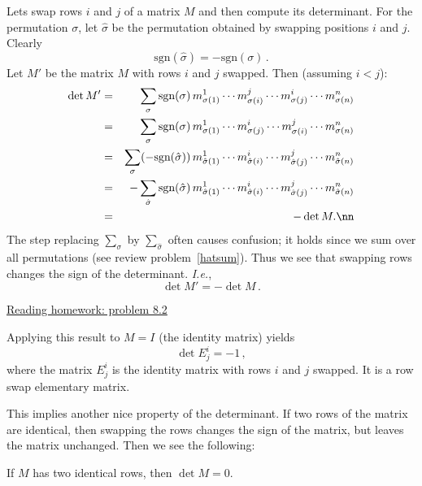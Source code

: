 \begin{remark}
Lets \hypertarget{rowswap}{swap}
 rows $i$ and $j$ of  a matrix $M$ and then compute its determinant.  For the permutation $\sigma$, let $\hat{\sigma}$ be the permutation obtained by swapping positions $i$ and $j$.  Clearly \[\text{sgn}(\hat{\sigma})=-\text{sgn}(\sigma)\, .\]  Let  $M'$ be the matrix $M$ with rows $i$ and $j$ swapped.  Then  (assuming $i<j$):
\begin{eqnarray}
\det M' & = & \sum_{\sigma} \text{sgn}(\sigma)\, m^1_{\sigma(1)}\cdots m^j_{\sigma(i)}\cdots m^i_{\sigma(j)} \cdots m^n_{\sigma(n)} \nonumber \\
& = & \sum_{\sigma} \text{sgn}(\sigma) \,m^1_{\sigma(1)}\cdots m^i_{\sigma(j)}\cdots m^j_{\sigma(i)} \cdots m^n_{\sigma(n)} \nonumber \\
& = & \sum_{\sigma}(-\text{sgn}(\hat{\sigma})) \,m^1_{\hat{\sigma}(1)}\cdots m^i_{\hat{\sigma}(i)}\cdots m^j_{\hat{\sigma}(j)} \cdots m^n_{\hat{\sigma}(n)} \nonumber \\
& = & - \sum_{\hat{\sigma}} \text{sgn}(\hat{\sigma}) \,m^1_{\hat{\sigma}(1)}\cdots m^i_{\hat{\sigma}(i)}\cdots m^j_{\hat{\sigma}(j)} \cdots m^n_{\hat{\sigma}(n)} \nonumber \\
& = & -\det M.\nn
\end{eqnarray}
The step replacing $\sum_\sigma$ by $\sum_{\hat \sigma}$ often causes confusion; it holds since we sum over all permutations (see review problem~\ref{hatsum}).
Thus we see that swapping rows changes the sign of the determinant. {\it I.e.}, \[\det M' = - \det M\, .\]

\begin{center}\href{\webworkurl ReadingHomework8/2/}{Reading homework: problem 8.2}\end{center}

Applying this result to $M=I$ (the identity matrix) yields
\[\det E^i_j=-1\, ,\]
where the matrix $E^i_j$ is the identity matrix with rows $i$ and $j$ swapped. It is a row swap  elementary matrix.

This implies another nice property of the determinant.  If two rows of the matrix are identical, then swapping the rows changes the sign of the matrix, but leaves the matrix unchanged.  Then we see the following:
\begin{theorem}
If $M$ has two identical rows, then $\det M = 0$.
\end{theorem}

\end{remark}



